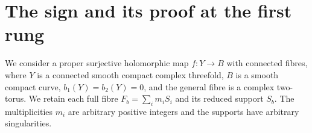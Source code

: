 \section*{The sign and its proof at the first rung}
We consider a proper surjective holomorphic map
$f:Y\to B$ with connected fibres, where $Y$ is a connected
smooth compact complex threefold, $B$ is a smooth compact curve,
$b_1(Y)=b_2(Y)=0$, and the general fibre is a complex two-torus.
We retain each full fibre $F_b=\sum_i m_iS_i$ and its
reduced support $S_b$.  The multiplicities $m_i$ are arbitrary
positive integers and the supports have arbitrary singularities.

\RungOne
